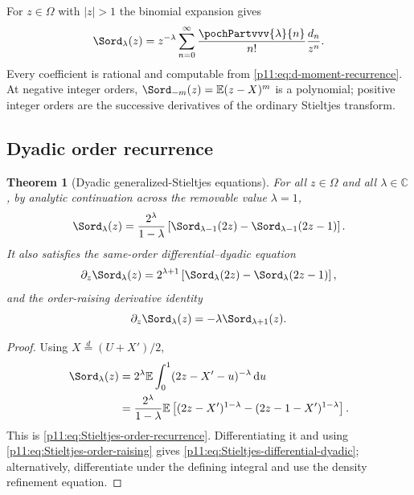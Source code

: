 \documentclass[11pt,oneside]{article}
\newtheorem{theorem}{Theorem}[section]
\theoremstyle{definition}
\theoremstyle{remark}
\newcommand{\E}{\mathbb E}
\newcommand{\C}{\mathbb C}
\newcommand{\dd}{\,\mathrm d}
\newcommand{\1}{\mathbf 1}
\begin{document}
For $z\in\Omega$ with $|z|>1$ the binomial expansion gives
\begin{equation}
 \Sord_\lambda(z)
 =z^{-\lambda}\sum_{n=0}^{\infty}
  \frac{\pochPartvvv{\lambda}{n}}{n!}\frac{d_n}{z^n}.
 \label{p11:eq:Stieltjes-moment-series}
\end{equation}
Every coefficient is rational and computable from
\eqref{p11:eq:d-moment-recurrence}.  At negative integer orders,
$\Sord_{-m}(z)=\E(z-X)^m$ is a polynomial; positive integer orders are the
successive derivatives of the ordinary Stieltjes transform.

\subsection{Dyadic order recurrence}

\begin{theorem}[Dyadic generalized-Stieltjes equations]
\label{p11:thm:Stieltjes-dyadic}
For all $z\in\Omega$ and all $\lambda\in\C$, by analytic continuation across
the removable value $\lambda=1$,
\begin{equation}
 \Sord_\lambda(z)
 =\frac{2^\lambda}{1-\lambda}
  \left[\Sord_{\lambda-1}(2z)
       -\Sord_{\lambda-1}(2z-1)\right].
 \label{p11:eq:Stieltjes-order-recurrence}
\end{equation}
It also satisfies the same-order differential--dyadic equation
\begin{equation}
 \partial_z\Sord_\lambda(z)
 =2^{\lambda+1}
  \left[\Sord_\lambda(2z)-\Sord_\lambda(2z-1)\right],
 \label{p11:eq:Stieltjes-differential-dyadic}
\end{equation}
and the order-raising derivative identity
\begin{equation}
 \partial_z\Sord_\lambda(z)=-\lambda\Sord_{\lambda+1}(z).
 \label{p11:eq:Stieltjes-order-raising}
\end{equation}
\end{theorem}

\begin{proof}
Using $X\overset d=(U+X')/2$,
\begin{align}
 \Sord_\lambda(z)
 &=2^\lambda\E\int_0^1(2z-X'-u)^{-\lambda}\dd u\\
 &=\frac{2^\lambda}{1-\lambda}
   \E\left[(2z-X')^{1-\lambda}
          -(2z-1-X')^{1-\lambda}\right].
\end{align}
This is \eqref{p11:eq:Stieltjes-order-recurrence}.  Differentiating it and using
\eqref{p11:eq:Stieltjes-order-raising} gives
\eqref{p11:eq:Stieltjes-differential-dyadic}; alternatively, differentiate under
the defining integral and use the density refinement equation.
\end{proof}
\end{document}
